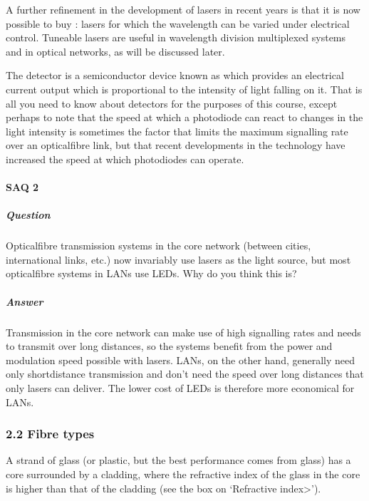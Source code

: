 \documentclass[letterpaper,10pt,english]{sphinxmanual}
\begin{document}
A further refinement in the development of lasers in recent years is that it is now possible to buy : lasers for which the wavelength can be varied under electrical control. Tuneable lasers are useful in wavelength division multiplexed systems and in optical networks, as will be discussed later.

The detector is a semiconductor device known as  which provides an electrical current output which is proportional to the intensity of light falling on it. That is all you need to know about detectors for the purposes of this course, except perhaps to note that the speed at which a photodiode can react to changes in the light intensity is sometimes the factor that limits the maximum signalling rate over an optical\sphinxhyphen{}fibre link, but that recent developments in the technology have
increased the speed at which photodiodes can operate.


\paragraph{SAQ 2}
\label{\detokenize{content/session_00/Part_00_02:SAQ-2}}

\subparagraph{Question}
\label{\detokenize{content/session_00/Part_00_02:id1}}
Optical\sphinxhyphen{}fibre transmission systems in the core network (between cities, international links, etc.) now invariably use lasers as the light source, but most optical\sphinxhyphen{}fibre systems in LANs use LEDs. Why do you think this is?


\subparagraph{Answer}
\label{\detokenize{content/session_00/Part_00_02:id2}}
Transmission in the core network can make use of high signalling rates and needs to transmit over long distances, so the systems benefit from the power and modulation speed possible with lasers. LANs, on the other hand, generally need only short\sphinxhyphen{}distance transmission and don’t need the speed over long distances that only lasers can deliver. The lower cost of LEDs is therefore more economical for LANs.


\subsubsection{2.2 Fibre types}
\label{\detokenize{content/session_00/Part_00_02:2.2-Fibre-types}}
A strand of glass (or plastic, but the best performance comes from glass) has a core surrounded by a cladding, where the refractive index of the glass in the core is higher than that of the cladding (see the box on ‘Refractive index\textgreater{}’).
\end{document}
